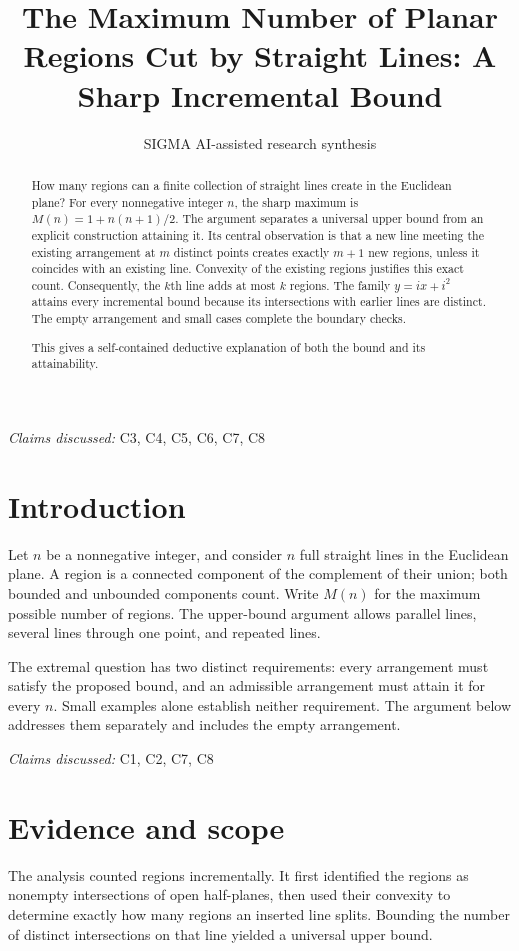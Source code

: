 \documentclass[11pt]{article}
\title{The Maximum Number of Planar Regions Cut by Straight Lines: A Sharp Incremental Bound}
\date{}
\author{SIGMA AI-assisted research synthesis}
\begin{document}
\maketitle

\begin{abstract}
How many regions can a finite collection of straight lines create in the Euclidean plane? For every nonnegative integer $n$, the sharp maximum is $M(n)=1+n(n+1)/2$. The argument separates a universal upper bound from an explicit construction attaining it. Its central observation is that a new line meeting the existing arrangement at $m$ distinct points creates exactly $m+1$ new regions, unless it coincides with an existing line. Convexity of the existing regions justifies this exact count. Consequently, the $k$th line adds at most $k$ regions. The family $y=ix+i^2$ attains every incremental bound because its intersections with earlier lines are distinct. The empty arrangement and small cases complete the boundary checks.

This gives a self-contained deductive explanation of both the bound and its attainability.
\end{abstract}
\textit{Claims discussed: }C3, C4, C5, C6, C7, C8
\section{Introduction}
Let $n$ be a nonnegative integer, and consider $n$ full straight lines in the Euclidean plane. A region is a connected component of the complement of their union; both bounded and unbounded components count. Write $M(n)$ for the maximum possible number of regions. The upper-bound argument allows parallel lines, several lines through one point, and repeated lines.

The extremal question has two distinct requirements: every arrangement must satisfy the proposed bound, and an admissible arrangement must attain it for every $n$. Small examples alone establish neither requirement. The argument below addresses them separately and includes the empty arrangement.

\textit{Claims discussed: }C1, C2, C7, C8
\section{Evidence and scope}
The analysis counted regions incrementally. It first identified the regions as nonempty intersections of open half-planes, then used their convexity to determine exactly how many regions an inserted line splits. Bounding the number of distinct intersections on that line yielded a universal upper bound.
\end{document}

